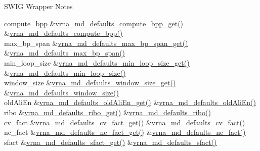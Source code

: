 \begin{DoxyRefDesc}{S\+W\+I\+G Wrapper Notes}
\begin{longtabu}
compute\+\_\+bpp &\hyperlink{group__model__details_gaa3a537e61fbe0518673bf9f73fd820f3}{vrna\+\_\+md\+\_\+defaults\+\_\+compute\+\_\+bpp\+\_\+get()} &\hyperlink{group__model__details_gaf1b5db10f1f476767f9a95f8a78e3132}{vrna\+\_\+md\+\_\+defaults\+\_\+compute\+\_\+bpp()} \\
max\+\_\+bp\+\_\+span &\hyperlink{group__model__details_gaa60f989e062fecd4d4bac89c1883da85}{vrna\+\_\+md\+\_\+defaults\+\_\+max\+\_\+bp\+\_\+span\+\_\+get()} &\hyperlink{group__model__details_ga4c4bc962f09b4480cb8499f1cf8ae4ec}{vrna\+\_\+md\+\_\+defaults\+\_\+max\+\_\+bp\+\_\+span()} \\
min\+\_\+loop\+\_\+size &\hyperlink{group__model__details_ga5cc691174a75c652807dc361b617632a}{vrna\+\_\+md\+\_\+defaults\+\_\+min\+\_\+loop\+\_\+size\+\_\+get()} &\hyperlink{group__model__details_gac152f1e78c1058a10261022c8dfda0f7}{vrna\+\_\+md\+\_\+defaults\+\_\+min\+\_\+loop\+\_\+size()} \\
window\+\_\+size &\hyperlink{group__model__details_ga670146a9aa3ba77f4d422d60b7c30ac9}{vrna\+\_\+md\+\_\+defaults\+\_\+window\+\_\+size\+\_\+get()} &\hyperlink{group__model__details_ga7b802ce0e8c3181bf5cb580de6d5b26a}{vrna\+\_\+md\+\_\+defaults\+\_\+window\+\_\+size()} \\
old\+Ali\+En &\hyperlink{group__model__details_ga2374492b5019df88022fe4c05f0f3630}{vrna\+\_\+md\+\_\+defaults\+\_\+old\+Ali\+En\+\_\+get()} &\hyperlink{group__model__details_ga41521d5b9fb7e0f31e7ea73f5792afab}{vrna\+\_\+md\+\_\+defaults\+\_\+old\+Ali\+En()} \\
ribo &\hyperlink{group__model__details_ga169027f0c0561ea7d87b655e4b336bfc}{vrna\+\_\+md\+\_\+defaults\+\_\+ribo\+\_\+get()} &\hyperlink{group__model__details_ga937c45e1d06fd6168730a9b08d130be3}{vrna\+\_\+md\+\_\+defaults\+\_\+ribo()} \\
cv\+\_\+fact &\hyperlink{group__model__details_gae59c68393807217b0a2497adb64d3ee3}{vrna\+\_\+md\+\_\+defaults\+\_\+cv\+\_\+fact\+\_\+get()} &\hyperlink{group__model__details_gad3a3f40baafd91a6ce80a91a68e20053}{vrna\+\_\+md\+\_\+defaults\+\_\+cv\+\_\+fact()} \\
nc\+\_\+fact &\hyperlink{group__model__details_ga7ac759eaa7159bf5f022745f5da59508}{vrna\+\_\+md\+\_\+defaults\+\_\+nc\+\_\+fact\+\_\+get()} &\hyperlink{group__model__details_gac35e596c850dce3ad55c49119fd7d471}{vrna\+\_\+md\+\_\+defaults\+\_\+nc\+\_\+fact()} \\
sfact &\hyperlink{group__model__details_gab2df6aab954b63fd3592d18e90285dae}{vrna\+\_\+md\+\_\+defaults\+\_\+sfact\+\_\+get()} &\hyperlink{group__model__details_ga3f73d3029d3d0025d4cc311510cd95a3}{vrna\+\_\+md\+\_\+defaults\+\_\+sfact()} \\
\end{longtabu}
\end{DoxyRefDesc}


